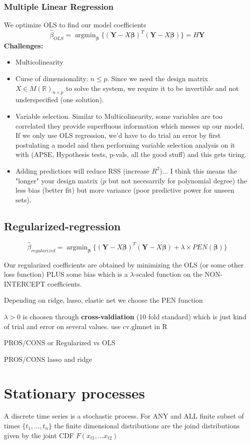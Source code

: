 \documentclass{article}
\DeclareMathOperator*{\argmin}{argmin} %
\begin{document}
\subsubsection{Multiple Linear Regression}
We optimize OLS to find our model coefficients
\[ \hat  \beta_{OLS} = \argmin_{\bm \beta} \{ (\bm Y - X\bm \beta)^T(\bm Y - X\bm \beta) \} = H \bm Y\]
\textbf{Challenges:}
\begin{itemize}
\item Multicolinearity
\item Curse of dimensionality: $n \leq p$. Since we need the design matrix $X \in M(\mathbb{R})_{n \times p}$ to solve the system, we require it to be invertible and not underspecified (one solution).
\item Variable selection. Similar to Multicolinearity, some variables are too correlated they provide superfluous information which messes up our model. If we only use OLS regression, we'd have to do trial an error by first postulating a model and then performing variable selection analysis on it with (APSE, Hypothesis tests, p-vals, all the good stuff) and this gets tiring. 
\item Adding predictiors will reduce RSS (increase $R^2$)... I think this means the "longer" your design matrix ($p$ but not necesarrily for polynomial degree) the less bias (better fit) but more variance (poor predictive power for unseen sets).  
\end{itemize}

\subsection{Regularized-regression}
\[ \hat  \beta_{regularized} = \argmin_{\bm \beta} \{ (\bm Y - X\bm \beta)^T(\bm Y - X\bm \beta) + \lambda \times PEN(\bm \beta)\} \]

Our regularized coefficients are obtained by minimizing the OLS (or some other loss function) PLUS some bias which is a $\lambda$-scaled function on the NON-INTERCEPT coefficients. 

Depending on ridge, lasso, elastic net we choose the PEN function 

$\lambda > 0$ is choosen through \textbf{cross-valdiation} (10 fold standard) which is just kind of trial and error on several values. use cv.glmnet in R

PROS/CONS or Regularized vs OLS

PROS/CONS lasso and ridge


\section{Stationary processes}
A discrete time series is a stochastic process. For ANY and ALL finite subset of times $\{t_1, \dots, t_n\}$ the finite dimensional distributions are the joind distributions given by the joint CDF $F(x_{t1}, \dots x_{t2})$
\end{document}
